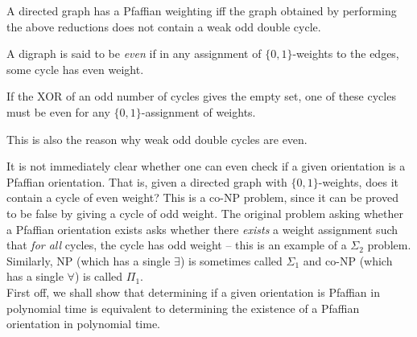 \begin{ftheo}
	A directed graph has a Pfaffian weighting iff the graph obtained by performing the above reductions does not contain a weak odd double cycle.
\end{ftheo}



\begin{fdef}
	A digraph is said to be \emph{even} if in any assignment of $\{0,1\}$-weights to the edges, some cycle has even weight.
\end{fdef}

\begin{fprop}
	\label{prop:1}
	If the XOR of an odd number of cycles gives the empty set, one of these cycles must be even for any $\{0,1\}$-assignment of weights.
\end{fprop}
This is also the reason why weak odd double cycles are even.

It is not immediately clear whether one can even check if a given orientation is a Pfaffian orientation. That is, given a directed graph with $\{0,1\}$-weights, does it contain a cycle of even weight? This is a co-\textsf{NP} problem, since it can be proved to be false by giving a cycle of odd weight. The original problem asking whether a Pfaffian orientation exists asks whether there \emph{exists} a weight assignment such that \emph{for all} cycles, the cycle has odd weight -- this is an example of a $\Sigma_2$ problem. Similarly, \textsf{NP} (which has a single $\exists$) is sometimes called $\Sigma_1$ and co-\textsf{NP} (which has a single $\forall$) is called $\Pi_1$.\\

First off, we shall show that determining if a given orientation is Pfaffian in polynomial time is equivalent to determining the existence of a Pfaffian orientation in polynomial time. 



